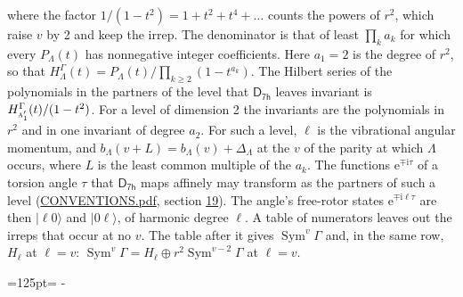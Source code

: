 \documentclass[10pt,a4paper]{article}
\newcommand{\needspace}[1]{\par\penalty-100\begingroup\dimen0=#1\relax\dimen2=\pagegoal
  \advance\dimen2-\pagetotal\ifdim\dimen0>\dimen2\relax\ifdim\dimen2>0pt\vfil\break\fi\fi
  \endgroup}
\numberwithin{equation}{section}
\newcommand{\grp}[1]{\mathsf{#1}}
\newcommand{\irr}[1]{\text{\normalfont\scshape #1}}
\newcommand{\iunit}{\mathrm{i}}
\newcommand{\expe}{\mathrm{e}}
\newcommand{\occ}[1]{\lvert #1\rangle}
\begin{document}
where the factor $1/(1 - t^2) = 1 + t^2 + t^4 + \dots$ counts the powers of $r^2$, which raise $v$ by 2 and keep the irrep. The denominator is that of least $\prod_k a_k$ for which every $P_\Lambda(t)$ has nonnegative integer coefficients. Here $a_1 = 2$ is the degree of $r^2$, so that $H^{\Gamma}_\Lambda(t) = P_\Lambda(t)/\prod_{k\ge2}(1 - t^{a_k})$. The Hilbert series of the polynomials in the partners of the level that $\grp{D_{7h}}$ leaves invariant is $H^{\Gamma}_{\irr{a}_{1}'}(t)/(1 - t^2)$. For a level of dimension 2 the invariants are the polynomials in $r^2$ and in one invariant of degree $a_2$. \label{n:index.overtone.period}\label{n:index.increment.unitary}For such a level, $\ell$ is the vibrational angular momentum, and $b_\Lambda(v + L) = b_\Lambda(v) + \Delta_\Lambda$ at the $v$ of the parity at which $\Lambda$ occurs, where $L$ is the least common multiple of the $a_k$. \label{n:local.torsion.angle}The functions $\expe^{\mp\iunit\tau}$ of a torsion angle $\tau$ that $\grp{D_{7h}}$ maps affinely may transform as the partners of such a level (\href{../../CONVENTIONS.pdf}{CONVENTIONS.pdf}, section \href{../../CONVENTIONS.pdf\#conv.19}{19}). The angle's free-rotor states $\expe^{\mp\iunit\ell\tau}$ are then $\occ{\ell 0}$ and $\occ{0 \ell}$, of harmonic degree $\ell$. A table of numerators leaves out the irreps that occur at no $v$. The table after it gives $\operatorname{Sym}^{v}\Gamma$ and, in the same row, $H_\ell$ at $\ell = v$: $\operatorname{Sym}^{v}\Gamma = H_\ell \oplus r^2\operatorname{Sym}^{v-2}\Gamma$ at $\ell = v$.
\needspace{125pt}
\end{document}
